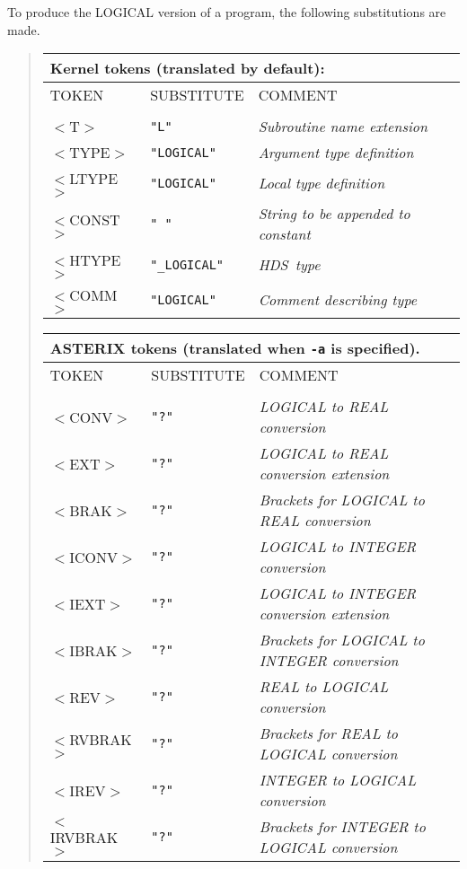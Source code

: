 \documentclass[twoside,11pt,nolof]{starlink}
\providecommand{\HDS}{{\footnotesize HDS}\normalsize}
\begin{document}
To produce the LOGICAL version of a program, the following substitutions
are made.
\begin{quote}
\begin{tabular}{lll}
\multicolumn{3}{l}{\bf{Kernel} tokens (translated by default):}\\
\hline
TOKEN      &SUBSTITUTE      &COMMENT \\
\\
$<$T$>$        &\texttt{"L"}         &\emph{Subroutine name extension}\\
$<$TYPE$>$     &\texttt{"LOGICAL"}   &\emph{Argument type definition}\\
$<$LTYPE$>$    &\texttt{"LOGICAL"}   &\emph{Local type definition}\\
$<$CONST$>$    &\texttt{" "}         &\emph{String to be appended to constant}\\
$<$HTYPE$>$    &\texttt{"\_LOGICAL"} &\emph{\HDS\ type}\\
$<$COMM$>$     &\texttt{"LOGICAL"}   &\emph{Comment describing type}\\
\end{tabular}

\begin{tabular}{lll}
\multicolumn{3}{l}{\bf{ASTERIX} tokens (translated when \texttt{-a} is specified).}\\
\hline
TOKEN      &SUBSTITUTE      &COMMENT\\
\\
$<$CONV$>$     &\texttt{"?"} &\emph{LOGICAL to REAL conversion}\\
$<$EXT$>$      &\texttt{"?"} &\emph{LOGICAL to REAL conversion extension}\\
$<$BRAK$>$     &\texttt{"?"} &\emph{Brackets for LOGICAL to REAL conversion}\\
$<$ICONV$>$    &\texttt{"?"} &\emph{LOGICAL to INTEGER conversion}\\
$<$IEXT$>$     &\texttt{"?"} &\emph{LOGICAL to INTEGER conversion extension}\\
$<$IBRAK$>$    &\texttt{"?"} &\emph{Brackets for LOGICAL to INTEGER conversion}\\
$<$REV$>$      &\texttt{"?"} &\emph{REAL to LOGICAL conversion}\\
$<$RVBRAK$>$   &\texttt{"?"} &\emph{Brackets for REAL to LOGICAL conversion}\\
$<$IREV$>$     &\texttt{"?"} &\emph{INTEGER to LOGICAL conversion}\\
$<$IRVBRAK$>$  &\texttt{"?"} &\emph{Brackets for INTEGER to LOGICAL conversion}\\
\end{tabular}
\end{quote}
\end{document}
